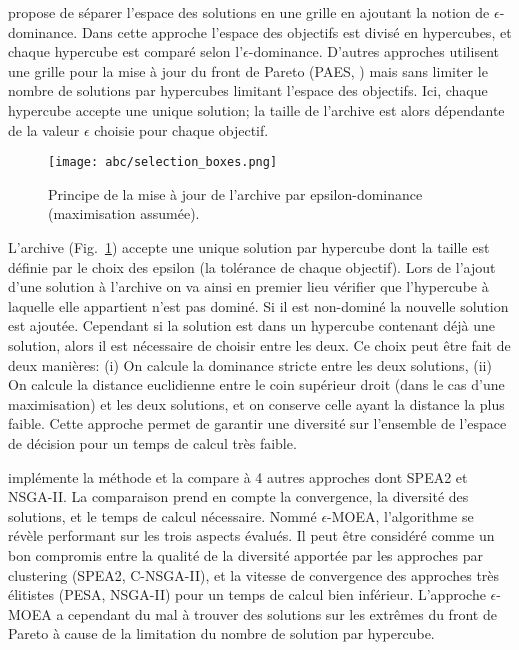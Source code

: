 \cite{Laumanns2002263} propose de séparer l’espace des solutions en une grille en ajoutant la notion
de $\epsilon$-dominance. Dans cette approche l’espace des objectifs est divisé en hypercubes,
et chaque hypercube est comparé selon l’$\epsilon$-dominance. D’autres approches
utilisent une grille pour la mise à jour du front de Pareto (PAES, \cite{Knowles2000149}) mais
sans limiter le nombre de solutions par hypercubes limitant l’espace des objectifs. Ici,
chaque hypercube accepte une unique solution; la taille de l’archive est alors dépendante de la valeur
$\epsilon$ choisie pour chaque objectif.

\begin{figure}
    \begin{center}
        \texttt{[image: abc/selection\_boxes.png]}
    \end{center}
    \caption{Principe de la mise à jour de l’archive par epsilon-dominance (maximisation assumée).
             \label{fig:epsilon_dominance}}
\end{figure}
L’archive (Fig.~\ref{fig:epsilon_dominance}) accepte une unique solution par hypercube dont la taille est définie par le
choix des epsilon (la tolérance de chaque objectif).
Lors de l’ajout d’une solution à l’archive on va ainsi en premier lieu vérifier que
l’hypercube à laquelle elle appartient n’est pas dominé. Si il est non-dominé la
nouvelle solution est ajoutée. Cependant si la solution est dans un hypercube contenant
déjà une solution, alors il est nécessaire de choisir entre les deux.
Ce choix peut être fait de deux manières: (i) On calcule la dominance stricte entre les
deux solutions, (ii) On calcule la distance euclidienne entre le coin supérieur droit
(dans le cas d’une maximisation) et les deux solutions, et on conserve celle ayant
la distance la plus faible.
Cette approche permet de garantir une diversité sur l’ensemble de l’espace de
décision pour un temps de calcul très faible.

\cite{Deb2005501} implémente la méthode et la compare à 4 autres approches dont SPEA2 et NSGA-II.
La comparaison prend en compte la convergence, la diversité des solutions, et le temps
de calcul nécessaire. Nommé $\epsilon$-MOEA, l’algorithme se révèle performant sur les
trois aspects évalués. Il peut être considéré comme un bon compromis entre la qualité
de la diversité apportée par les approches par clustering (SPEA2, C-NSGA-II), et la
vitesse de convergence des approches très élitistes (PESA, NSGA-II) pour un temps de
calcul bien inférieur. L’approche $\epsilon$-MOEA a cependant du mal à trouver des
solutions sur les extrêmes du front de Pareto à cause de la limitation du nombre de
solution par hypercube.


